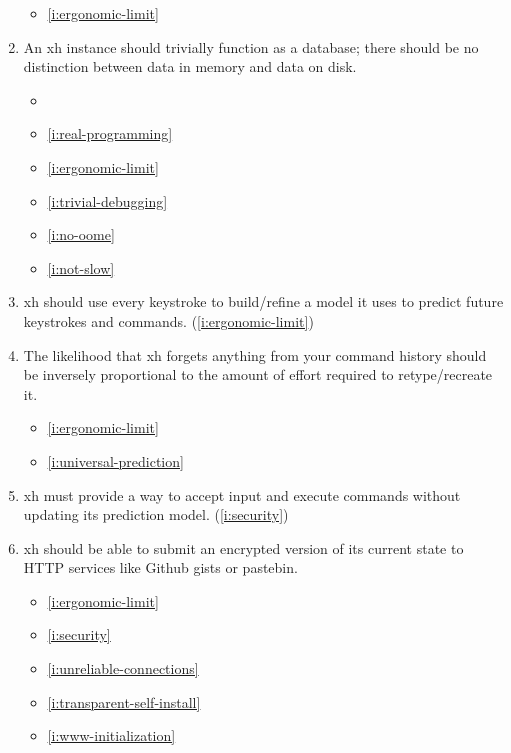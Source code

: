 \documentclass{report}
\makeatletter
\newcommand*{\Label}[2]{%
  \@bsphack
  \begingroup
    \label{#1-original}%
    \def\@currentlabel{#2 [\ref{#1-original}]}%
    \label{#1}%
  \endgroup
  \@esphack
}
\makeatother
\begin{document}
\begin{enumerate}
\begin{itemize}
\item \ref{i:ergonomic-limit}
\end{itemize}
\item{}\Label{i:trivial-database}{database}
  An xh instance should trivially function as a database; there should be
  no distinction between data in memory and data on disk.
\begin{itemize}
\item \initial
\item \ref{i:real-programming}
\item \ref{i:ergonomic-limit}
\item \ref{i:trivial-debugging}
\item \ref{i:no-oome}
\item \ref{i:not-slow}
\end{itemize}

\item{}\Label{i:universal-prediction}{prediction}
  xh should use every keystroke to build/refine a model it uses to predict
  future keystrokes and commands.
(\ref{i:ergonomic-limit})
\item{}\Label{i:forgetful-history}{history}
  The likelihood that xh forgets anything from your command history should
  be inversely proportional to the amount of effort required to
  retype/recreate it.
\begin{itemize}
\item \ref{i:ergonomic-limit}
\item \ref{i:universal-prediction}
\end{itemize}
\item{}\Label{i:locally-anonymous}{anonymous}
  xh must provide a way to accept input and execute commands without
  updating its prediction model.
(\ref{i:security})
\item{}\Label{i:http-client}{pastebin}
  xh should be able to submit an encrypted version of its current state to
  HTTP services like Github gists or pastebin.
\begin{itemize}
\item \ref{i:ergonomic-limit}
\item \ref{i:security}
\item \ref{i:unreliable-connections}
\item \ref{i:transparent-self-install}
\item \ref{i:www-initialization}
\end{itemize}


\end{enumerate}
\end{document}
